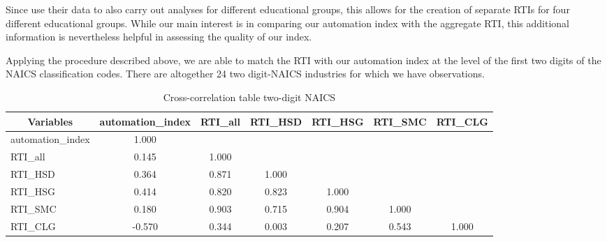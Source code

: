 \documentclass[11pt,a4paper]{article}
\begin{document}
Since \cite{ALM2003} use their data to also carry out analyses for different educational groups, this allows for the creation of separate RTIs for four different educational groups. While our main interest is in comparing our automation index with the aggregate RTI, this additional information is nevertheless helpful in assessing the quality of our index. 

Applying the procedure described above, we are able to match the RTI with our automation index at the level of the first two digits of the NAICS classification codes. There are altogether 24 two digit-NAICS industries for which we have observations.

\begin{comment}
\begin{table}[htbp]\centering \small \caption{Cross-correlation table one-digit NAICS\label{corrtable1}}
	\begin{tabular}{l  c  c  c  c  c  c }\hline\hline
		\multicolumn{1}{c}{Variables} &automation\_index&RTI\_all&
		RTI\_HSD&RTI\_HSG&RTI\_SMC&RTI\_CLG\\ \hline
		automation\_index&1.000\\
		RTI\_all&0.607&1.000\\
		RTI\_HSD&0.764&0.878&1.000\\
		RTI\_HSG&0.693&0.935&0.870&1.000\\
		RTI\_SMC&0.541&0.940&0.724&0.921&1.000\\
		RTI\_CLG&-0.418&0.191&-0.212&0.216&0.421&1.000\\
		\hline \hline 
	\end{tabular}
\end{table}
\end{comment}

\vspace{0.5cm}
\begin{table}[htbp]\centering \small \caption{Cross-correlation table two-digit NAICS\label{corrtable2}}
	\begin{tabular}{l  c  c  c  c  c  c }\toprule
		\multicolumn{1}{c}{Variables} &automation\_index&RTI\_all&
		RTI\_HSD&RTI\_HSG&RTI\_SMC&RTI\_CLG\\ \midrule
		automation\_index&1.000\\
		RTI\_all&0.145&1.000\\
		RTI\_HSD&0.364&0.871&1.000\\
		RTI\_HSG&0.414&0.820&0.823&1.000\\
		RTI\_SMC&0.180&0.903&0.715&0.904&1.000\\
		RTI\_CLG&-0.570&0.344&0.003&0.207&0.543&1.000\\
		\bottomrule 
	\end{tabular}
\end{table}
\vspace{0.5cm}
\end{document}
